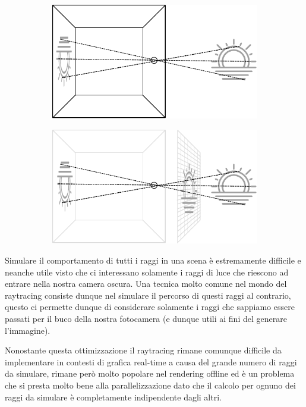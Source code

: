 \documentclass[12pt, twoside]{article}
\begin{document}
\begin{figure}[h]
  \centering
  \begin{subfigure}{.4\textwidth}
    \includegraphics[width=\linewidth]{images/PinholeCamera.pdf}
  \end{subfigure}
  \hspace{0.1\textwidth}
  \begin{subfigure}{.4\textwidth}
    \includegraphics[width=\linewidth]{images/PinholeFocalPlane.pdf}
  \end{subfigure}
\end{figure}

Simulare il comportamento di tutti i raggi in una scena è estremamente
difficile e neanche utile visto che ci interessano solamente i raggi di luce
che riescono ad entrare nella nostra camera oscura.
Una tecnica molto comune nel mondo del raytracing consiste dunque nel simulare
il percorso di questi raggi al contrario, questo ci permette dunque di
considerare solamente i raggi che sappiamo essere passati per il buco della
nostra fotocamera (e dunque utili ai fini del generare l'immagine). 

Nonostante questa ottimizzazione il raytracing rimane comunque difficile da
implementare in contesti di grafica real-time a causa del grande numero di
raggi da simulare, rimane però molto popolare nel rendering offline ed è un
problema che si presta molto bene alla parallelizzazione dato che il calcolo
per ognuno dei raggi da simulare è completamente indipendente dagli altri.
\end{document}
